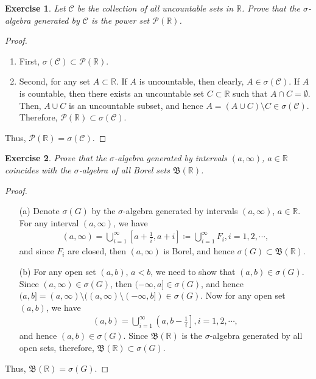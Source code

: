\documentclass[11pt]{book}
\newtheorem{exercise}{Exercise}[section]
\theoremstyle{definition}
\numberwithin{equation}{chapter}
\def\BB{\mathfrak{B}}
\begin{document}
\begin{exercise}
Let $\mathcal{C}$ be the collection of all uncountable sets in $\mathbb{R}$. Prove that the $\sigma$-algebra generated by $\mathcal{C}$ is the power set $\mathcal{P}(\mathbb{R})$.
\end{exercise}
\begin{proof} 
~\begin{enumerate}[label=(\alph*)]
    \item First, $\sigma(\mathcal{C}) \subset \mathcal{P}(\mathbb{R})$.
    
    \item Second, for any set $A \subset \mathbb{R}$. If $A$ is uncountable, then clearly, $A \in \sigma(\mathcal{C})$. If $A$ is countable, then there exists an uncountable set $C \subset \mathbb{R}$ such that $A \cap C = \emptyset$. Then, $A \cup C$ is an uncountable subset, and hence $A = (A \cup C) \setminus C \in \sigma(\mathcal{C})$. Therefore, $\mathcal{P}(\mathbb{R}) \subset \sigma(\mathcal{C})$.
\end{enumerate}
Thus, $\mathcal{P}(\mathbb{R}) = \sigma(\mathcal{C})$.
\end{proof}

\medskip

\begin{exercise}
Prove that the $\sigma$-algebra generated by intervals $(a,\infty)$, $a\in\mathbb{R}$ coincides with the $\sigma$-algebra of all Borel sets $\BB(\mathbb{R})$.
\end{exercise}
\begin{proof}
~\begin{enumerate}
    \item[(a)] Denote $\sigma(G)$ by the $\sigma$-algebra generated by intervals $(a,\infty)$, $a\in\mathbb{R}$. For any interval $(a,\infty)$, we have
    \begin{align*}
        (a,\infty) = \bigcup^\infty_{i=1} \left[a + \frac{1}{i}, a + i\right] \coloneqq \bigcup^\infty_{i=1} F_i, i = 1,2,\cdots,
    \end{align*}
    and since $F_i$ are closed, then $(a,\infty)$ is Borel, and hence $\sigma(G) \subset \BB(\mathbb{R})$.
    
    \item[(b)] For any open set $(a,b)$, $a < b$, we need to show that $(a,b) \in \sigma(G)$. Since $(a,\infty) \in \sigma(G)$, then $(-\infty,a] \in \sigma(G)$, and hence $(a,b] = (a,\infty) \setminus ((a,\infty) \setminus (-\infty,b]) \in \sigma(G)$. Now for any open set $(a,b)$, we have
    \begin{align*}
        (a,b) = \bigcup^\infty_{i=1} \left(a,b-\frac{1}{i}\right], i = 1,2,\cdots,
    \end{align*}
    and hence $(a,b) \in \sigma(G)$. Since $\BB(\mathbb{R})$ is the $\sigma$-algebra generated by all open sets, therefore, $\BB(\mathbb{R}) \subset \sigma(G)$.
\end{enumerate}
Thus, $\BB(\mathbb{R}) = \sigma(G)$.
\end{proof}
\end{document}
